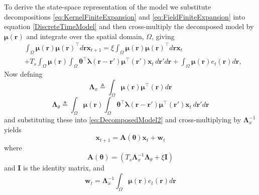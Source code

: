 \documentclass[journal,a4paper]{IEEEtran}
\begin{document}
To derive the state-space representation of the model we substitute decompositions \eqref{eq:KernelFiniteExpansion} and \eqref{eq:FieldFiniteExpansion} into equation \eqref{DiscreteTimeModel} and then cross-multiply the decomposed model by $\boldsymbol\mu\left(\mathbf r\right)$ and integrate over the spatial domain, $\Omega$, giving
\begin{align}\label{eq:DecomposedModel2} 
	&\int_{\Omega} \boldsymbol\mu  \left(\mathbf{r}\right)\boldsymbol\mu\left(\mathbf{r}\right)^\top  d\mathbf{r}\mathbf{x}_{t+1}= 
	\xi\int_{\Omega}\boldsymbol\mu\left(\mathbf{r}\right)\boldsymbol\mu\left(\mathbf{r}\right)^\top d\mathbf{r}\mathbf{x}_t \nonumber \\
	&+T_s \int_{\Omega}\boldsymbol\mu\left(\mathbf{r}\right) \int_\Omega { 
	   \boldsymbol\theta^\top\boldsymbol\lambda\left(\mathbf{r}-\mathbf{r'}\right)
	    \boldsymbol\mu^\top\left(\mathbf{r'}\right)\mathbf{x}_t 
	\, d\mathbf{r}'d\mathbf{r}}
	+ \int_{\Omega}\boldsymbol\mu\left(\mathbf{r}\right)e_t\left(\mathbf{r}\right)d\mathbf{r}, 
\end{align}
Now defning 
\begin{equation}\label{eq:Lambdax}
 \mathbf{\Lambda}_{x} \triangleq \int_{\Omega}\boldsymbol\mu\left(\mathbf{r}\right)\boldsymbol\mu^\top\left(\mathbf{r}\right) d\mathbf{r}
\end{equation}
\begin{equation}\label{eq:Lambdatheta}
 \mathbf{\Lambda}_{\theta}\triangleq\int_{\Omega}\boldsymbol\mu\left(\mathbf{r}\right) \int_\Omega { 
	   \boldsymbol\theta^\top\boldsymbol\lambda\left(\mathbf{r}-\mathbf{r'}\right)
	    \boldsymbol\mu^\top\left(\mathbf{r'}\right)\mathbf{x}_t 
	\, d\mathbf{r}'d\mathbf{r}}
\end{equation}
and substituting these into \eqref{eq:DecomposedModel2} and cross-multiplying by $\mathbf{\Lambda}_{x}^{-1}$ yields
\begin{equation}\label{eq:StateEquation}
 \mathbf x_{t+1}=\mathbf A(\boldsymbol \theta) \mathbf x_t+ \mathbf w_t
\end{equation}
where
\begin{equation}\label{eq:A_theta}
 \mathbf A(\boldsymbol \theta)=(T_s\mathbf{\Lambda}_{x}^{-1}\mathbf{\Lambda}_{\theta}+\xi\mathbf I)
\end{equation}
and $\mathbf I$ is the identity matrix, and 
\begin{equation}\label{eq:Disturbance}
\mathbf w_t= \mathbf{\Lambda}_{x}^{-1}\int_{\Omega}\boldsymbol\mu \left(\mathbf{r}\right)e_t\left(\mathbf{r}\right)d\mathbf{r}
\end{equation}
\end{document}

